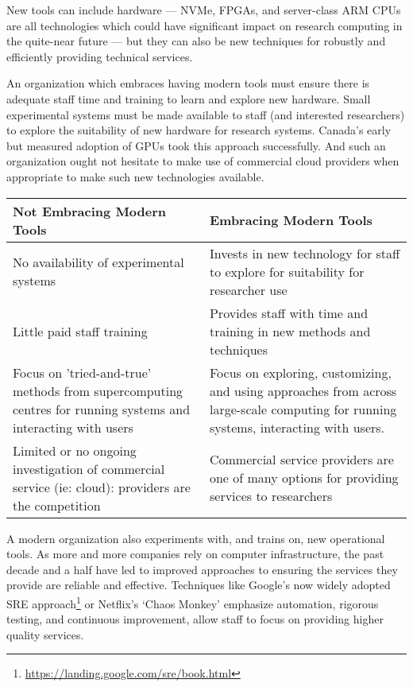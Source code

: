 \documentclass[11pt, letterpaper, twoside]{article}
\begin{document}
New tools can include hardware --- NVMe, FPGAs, and server-class ARM
CPUs are all technologies which could have significant impact on
research computing in the quite-near future --- but they can also be new
techniques for robustly and efficiently providing technical services.


An organization which embraces having modern tools must ensure there is
adequate staff time and training to learn and explore new hardware.
Small experimental systems must be made available to staff (and
interested researchers) to explore the suitability of new hardware for
research systems. Canada's early but measured adoption of GPUs took this
approach successfully. And such an organization ought not hesitate to
make use of commercial cloud providers when appropriate to make such new
technologies available.

\begin{table}[ht] \centering \small {\sffamily
{} \begin{tabular}{P{2.5in}|P{2.5in}}
\textcolor{cdaRed}{\textbf{Not Embracing Modern Tools}} &
\textcolor{cdaRed}{\textbf{Embracing Modern Tools}} \\ \hline \hline No
availability of experimental systems & Invests in new technology
for staff to explore for suitability for researcher use \\ Little
paid staff training & Provides staff with time and training in new
methods and techniques \\ 
Focus on 'tried-and-true' methods from supercomputing centres for
running systems and interacting with users & Focus on exploring,
customizing, and using approaches from across large-scale computing for
running systems, interacting with users. \\
Limited or no ongoing investigation of commercial service (ie: cloud):
providers are the competition & Commercial service providers are one of
many options for providing services to researchers\\
\hline
\end{tabular}
}
\end{table}

A modern organization also experiments with, and trains on, new
operational tools. As more and more companies rely on computer
infrastructure, the past decade and a half have led to improved
approaches to ensuring the services they provide are reliable and
effective. Techniques like Google's now widely adopted SRE
approach\footnote{\url{https://landing.google.com/sre/book.html}} or
Netflix's `Chaos Monkey' emphasize automation, rigorous testing, and
continuous improvement, allow staff to focus on providing higher quality
services.
\end{document}

